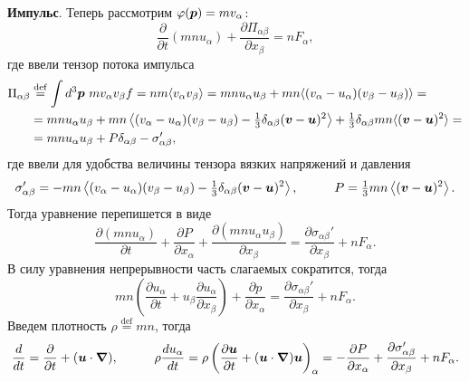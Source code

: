 \textbf{Импульс}. 
Теперь рассмотрим $\varphi(\boldsymbol{p}) = m v_\alpha$:
\begin{equation*}
	\frac{\partial }{\partial t} (m n u_\alpha) + \frac{\partial \Pi_{\alpha \beta}}{\partial x_\beta} = n F_\alpha,
\end{equation*}
где ввели тензор потока импульса
\begin{align*}
	\Pi_{\alpha \beta} &\overset{\mathrm{def}}{=} \int d^3\boldsymbol{p}\ m v_\alpha v_\beta f = n m \langle v_\alpha v_\beta \rangle 
	= m n u_\alpha u_\beta + mn \langle (v_\alpha - u_\alpha)(v_\beta-u_\beta)\rangle 
	= \\ &=
	m n u_\alpha u_\beta + mn \left\langle 
		(v_\alpha - u_\alpha)(v_\beta-u_\beta) - \tfrac{1}{3} \delta_{\alpha \beta} (\boldsymbol{v}-\boldsymbol{u})^2
	\right\rangle + \tfrac{1}{3} \delta_{\alpha \beta} mn  \langle (\boldsymbol{v}-\boldsymbol{u})^2\rangle
	= \\ &= 
	m n u_\alpha u_\beta  + P \delta_{\alpha \beta} - \sigma_{\alpha \beta}',
\end{align*}
где ввели для удобства величины тензора вязких напряжений и давления
\begin{equation*}
	\sigma_{\alpha \beta}' =  - mn \left\langle 
		(v_\alpha - u_\alpha) (v_\beta-u_\beta) - \tfrac{1}{3} \delta_{\alpha \beta} (\vc{v} - \vc{u})^2
	\right\rangle,
	\hspace{10 mm} 
	P  = \tfrac{1}{3} mn \left\langle (\vc{v}-\vc{u})^2\right\rangle.
\end{equation*}
Тогда уравнение перепишется в виде
\begin{equation*}
	\frac{\partial (mn u_\alpha)}{\partial t} + \frac{\partial P}{\partial x_\alpha} + \frac{\partial (mn u_\alpha u_\beta)}{\partial x_\beta}  = \frac{\partial \sigma_{\alpha\beta}'}{\partial x_\beta} + n F_\alpha.
\end{equation*}
В силу уравнения непрерывности часть слагаемых сократится, тогда 
\begin{equation*}
	m n \left(
		\frac{\partial u_\alpha}{\partial t}  + u_\beta \frac{\partial u_\alpha}{\partial x_\beta} 
	\right) + \frac{\partial p}{\partial x_\alpha}  = \frac{\partial \sigma_{\alpha \beta}'}{\partial x_\beta} + n F_\alpha.
\end{equation*}
Введем плотность $\rho \overset{\mathrm{def}}{=}  m n$, тогда
\begin{equation}
	\frac{d }{d t}  = \frac{\partial }{\partial t}  + (\vc{u} \cdot \vc{\nabla}),
	\hspace{10 mm} 
	\rho \frac{d u_\alpha}{d t} = \rho \left(
		\frac{\partial \vc{u}}{\partial t} + (\vc{u} \cdot \vc{\nabla}) \vc{u}
	\right)_\alpha = - \frac{\partial P}{\partial x_\alpha} + \frac{\partial \sigma_{\alpha \beta}'}{\partial x_\beta}  + n F_\alpha.
\end{equation}

